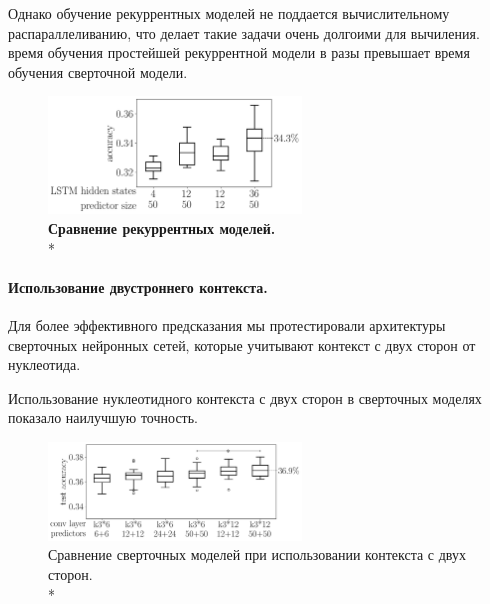 Однако обучение рекуррентных моделей не поддается вычислительному распараллеливанию, что делает такие задачи очень долгоими для вычиления. время обучения простейшей рекуррентной модели в разы превышает время обучения сверточной модели.  

\begin{figure}[H] %
	\centering
	\includegraphics[width = 0.6\textwidth]{pics/rnn_models_all_runs_p1_ecoli_100000_10000_50_0.png}
	\caption{{\bfseries Сравнение рекуррентных моделей.} \\* 
		   \mannwhitni }
	\label{fig:rnn_test}	
\end{figure}

\paragraph{Использование двустроннего контекста.} Для более эффективного предсказания мы протестировали архитектуры сверточных нейронных сетей, которые учитывают контекст с двух сторон от нуклеотида. 

Использование нуклеотидного контекста с двух сторон в сверточных моделях показало наилучшую точность.

\begin{figure}[H] %
	\centering
	\includegraphics[width = 0.6\textwidth]{pics/cnn_models_two_sided.png}
	\caption{{\bfseries} Сравнение сверточных моделей при использовании контекста с двух сторон.\\* }
	\label{fig:cnn_twosided}	
\end{figure}
	